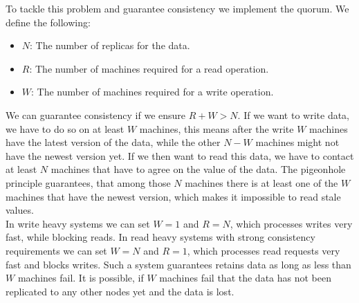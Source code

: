 To tackle this problem and guarantee consistency we implement the quorum. We define the following:
\begin{itemize}
\item $N$: The number of replicas for the data.
\item $R$: The number of machines required for a read operation.
\item $W$: The number of machines required for a write operation.
\end{itemize}
We can guarantee consistency if we ensure $R + W > N$. If we want to write data, we have to do so on at least $W$ machines, this means after the write $W$ machines have the latest version of the data, while the other $N-W$ machines might not have the newest version yet. If we then want to read this data, we have to contact at least $N$ machines that have to agree on the value of the data. The pigeonhole principle guarantees, that among those $N$ machines there is at least one of the $W$ machines that have the newest version, which makes it impossible to read stale values.\\
In write heavy systems we can set $W = 1$ and $R = N$, which processes writes very fast, while blocking reads. In read heavy systems with strong consistency requirements we can set $W = N$ and $R = 1$, which processes read requests very fast and blocks writes. Such a system guarantees retains data as long as less than $W$ machines fail. It is possible, if $W$ machines fail that the data has not been replicated to any other nodes yet and the data is lost.

